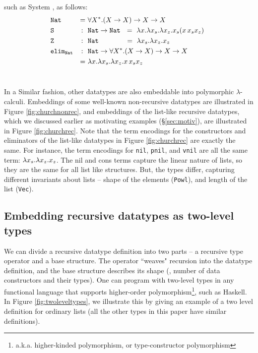 such as System \Fw, as follows:\vspace*{-2pt}
\begin{align*}
&\texttt{Nat} &=~& \forall X^{*}.(X -> X) -> X -> X \qquad\qquad\qquad\\
&\texttt{S} &\!\!\!:~~& \texttt{Nat} -> \texttt{Nat}
	~~ =~ \l x.\l x_s.\l x_z.x_s(x\,x_s x_z) \\
&\texttt{Z} &\!\!\!:~~& \texttt{Nat} \qquad\quad\,
	~~ =~ \l x_s.\l x_z.x_z \\
&\mathtt{elim_{Nat}} &\!\!\!:~~& \texttt{Nat} -> \forall X^{*}.(X -> X)-> X-> X \\
& &=~& \l x.\l x_s.\l x_z.x\,x_s x_z
\end{align*}~\vspace*{-13pt}

In a Similar fashion, other datatypes are also embeddable into
polymorphic $\lambda$-calculi.
Embeddings of some well-known non-recursive datatypes are illustrated
in Figure \ref{fig:churchnonrec}, and embeddings of the list-like
recursive datatypes, which we discussed earlier as motivating examples
(\S\ref{sec:motiv}), are illustrated in Figure \ref{fig:churchrec}.
Note that the term encodings for the constructors and eliminators of
the list-like datatypes in Figure \ref{fig:churchrec} are exactly the same.
For instance, the term encodings for \texttt{nil}, \texttt{pnil}, and
\texttt{vnil} are all the same term: $\lambda x_s.\lambda x_z.x_z$. The nil and cons terms
capture the linear nature of lists, so they are the same for all list like structures.
But, the types differ, capturing different invariants about lists -- shape of the elements ({\tt Powl}), and
length of the list ({\tt Vec}).

\subsection{Embedding recursive datatypes as two-level types}
\label{ssec:embedTwoLevel}
We can divide a recursive datatype definition into two parts --
a recursive type operator and a base structure. The operator ``weaves" recursion
into the datatype definition, and the base structure describes
its shape (\ie, number of data constructors and their types).
One can program with two-level types in any functional language that supports
higher-order polymorphism\footnote{a.k.a. higher-kinded polymorphism,
	or type-constructor polymorphism}, such as Haskell. 
In Figure \ref{fig:twoleveltypes}, we illustrate this by giving an example of a two level definition
for ordinary lists (all the other types in this paper have similar definitions).

